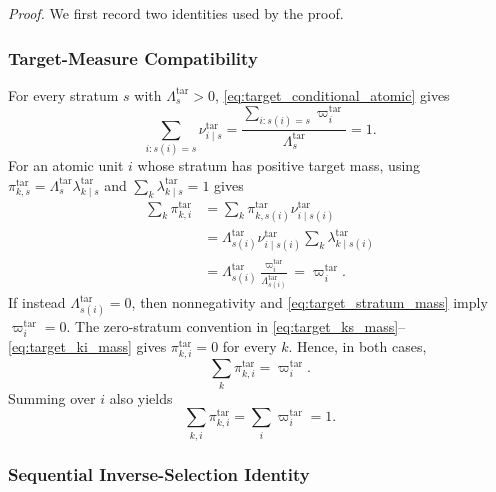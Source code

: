 \noindent\emph{Proof.}
We first record two identities used by the proof.

\subsubsection{Target-Measure Compatibility}

For every stratum $s$ with $\Lambda_s^{\mathrm{tar}}>0$,
\eqref{eq:target_conditional_atomic} gives
\begin{equation}
    \sum_{i:s(i)=s}
    \nu^{\mathrm{tar}}_{i\mid s}
    =
    \frac{
    \sum_{i:s(i)=s}\varpi_i^{\mathrm{tar}}
    }{
    \Lambda_s^{\mathrm{tar}}
    }
    =1.
    \label{eq:app_nu_normalization}
\end{equation}
For an atomic unit $i$ whose stratum has positive target mass, using
$\pi^{\mathrm{tar}}_{k,s}
=\Lambda_s^{\mathrm{tar}}
\lambda^{\mathrm{tar}}_{k\mid s}$ and
$\sum_k\lambda^{\mathrm{tar}}_{k\mid s}=1$ gives
\begin{align}
 \sum_k\pi^{\mathrm{tar}}_{k,i}
 &=
 \sum_k
 \pi^{\mathrm{tar}}_{k,s(i)}
 \nu^{\mathrm{tar}}_{i\mid s(i)}
 \nonumber\\
 &=
 \Lambda_{s(i)}^{\mathrm{tar}}
 \nu^{\mathrm{tar}}_{i\mid s(i)}
 \sum_k
 \lambda^{\mathrm{tar}}_{k\mid s(i)}
 \nonumber\\
 &=
 \Lambda_{s(i)}^{\mathrm{tar}}
 \frac{\varpi_i^{\mathrm{tar}}}
 {\Lambda_{s(i)}^{\mathrm{tar}}}
 =
 \varpi_i^{\mathrm{tar}}.
 \label{eq:app_target_compatibility_positive}
\end{align}
If instead $\Lambda_{s(i)}^{\mathrm{tar}}=0$, then nonnegativity and
\eqref{eq:target_stratum_mass} imply $\varpi_i^{\mathrm{tar}}=0$.  The
zero-stratum convention in
\eqref{eq:target_ks_mass}--\eqref{eq:target_ki_mass}
gives $\pi^{\mathrm{tar}}_{k,i}=0$ for every $k$.  Hence, in both cases,
\begin{equation}
 \sum_k\pi^{\mathrm{tar}}_{k,i}
 =\varpi_i^{\mathrm{tar}}.
 \label{eq:app_target_compatibility}
\end{equation}
Summing over $i$ also yields
\begin{equation}
    \sum_{k,i}\pi^{\mathrm{tar}}_{k,i}
    =
    \sum_i\varpi_i^{\mathrm{tar}}
    =1.
    \label{eq:app_pi_normalized}
\end{equation}

\subsubsection{Sequential Inverse-Selection Identity}

